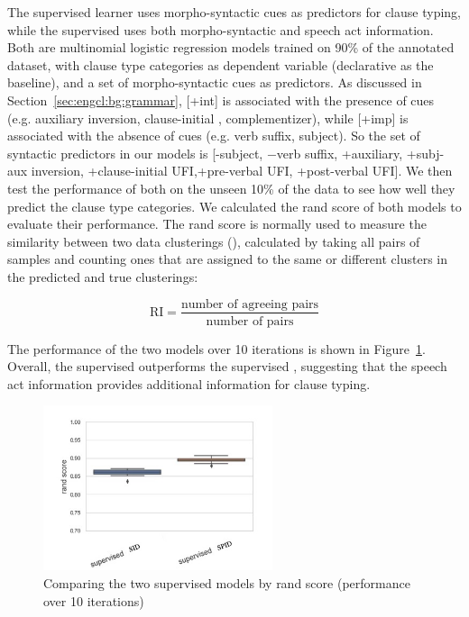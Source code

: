 The supervised \dlearnerabbr{} learner uses morpho-syntactic cues as predictors for clause typing, while the supervised \plearnerabbr{} uses both morpho-syntactic and speech act information. Both are multinomial logistic regression models trained on 90\% of the annotated dataset, with clause type categories as dependent variable (declarative as the baseline), and a set of morpho-syntactic cues as predictors. As discussed in Section~\ref{sec:engcl:bg:grammar}, [+int] is associated with the presence of cues (e.g. auxiliary inversion, clause-initial \twh{}, complementizer), while [+imp] is associated with the absence of cues (e.g. verb suffix, subject). So the set of syntactic predictors in our models is [-subject, $-$verb suffix, +auxiliary, +subj-aux inversion, +clause-initial UFI,+pre-verbal UFI, +post-verbal UFI]. We then test the performance of both on the unseen 10\% of the data to see how well they predict the clause type categories. We calculated the rand score of both models to evaluate their performance. The rand score is normally used to measure the similarity between two data clusterings (\cite{rand1971}), calculated by taking all pairs of samples and counting ones that are assigned to the same or different clusters in the predicted and true clusterings:

\begin{equation} \mbox{RI} =\frac{ \mbox{number of agreeing pairs}}{ \mbox{number of pairs}} 
\end{equation}


The performance of the two models over 10 iterations is shown in Figure~\ref{fig:super-compare-rand}. Overall, the supervised \praglearner{} outperforms the supervised \distlearner{}, suggesting that the speech act information provides additional information for clause typing.


\begin{figure}[H]
    \centering
    \includegraphics[width=0.6\textwidth]{figures/super-compare-rand-name.jpg}
    \caption{Comparing the two supervised models by rand score (performance over 10 iterations)}
    \label{fig:super-compare-rand}
\end{figure}



